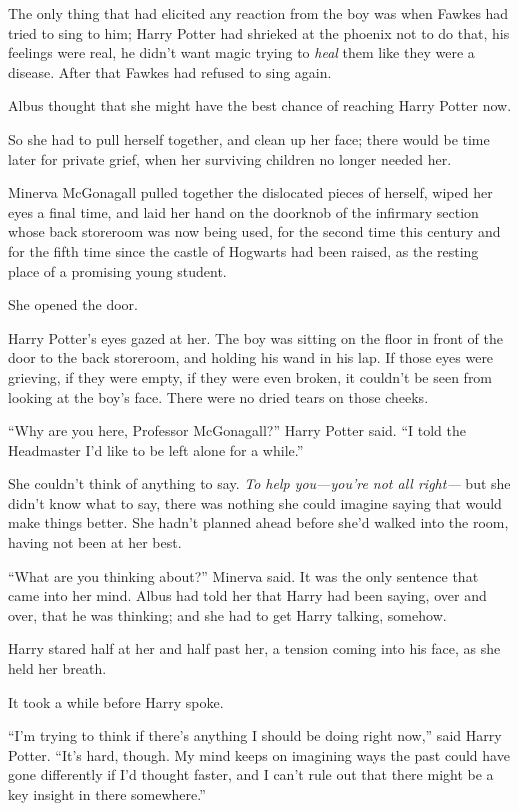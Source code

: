 The only thing that had elicited any reaction from the boy was when Fawkes had tried to sing to him; Harry Potter had shrieked at the phoenix not to do that, his feelings were real, he didn’t want magic trying to \emph{heal} them like they were a disease. After that Fawkes had refused to sing again.

Albus thought that she might have the best chance of reaching Harry Potter now.

So she had to pull herself together, and clean up her face; there would be time later for private grief, when her surviving children no longer needed her.

Minerva McGonagall pulled together the dislocated pieces of herself, wiped her eyes a final time, and laid her hand on the doorknob of the infirmary section whose back storeroom was now being used, for the second time this century and for the fifth time since the castle of Hogwarts had been raised, as the resting place of a promising young student.

She opened the door.

Harry Potter’s eyes gazed at her. The boy was sitting on the floor in front of the door to the back storeroom, and holding his wand in his lap. If those eyes were grieving, if they were empty, if they were even broken, it couldn’t be seen from looking at the boy’s face. There were no dried tears on those cheeks.

“Why are you here, Professor McGonagall?” Harry Potter said. “I told the Headmaster I’d like to be left alone for a while.”

She couldn’t think of anything to say. \emph{To help you—you’re not all right—} but she didn’t know what to say, there was nothing she could imagine saying that would make things better. She hadn’t planned ahead before she’d walked into the room, having not been at her best.

“What are you thinking about?” Minerva said. It was the only sentence that came into her mind. Albus had told her that Harry had been saying, over and over, that he was thinking; and she had to get Harry talking, somehow.

Harry stared half at her and half past her, a tension coming into his face, as she held her breath.

It took a while before Harry spoke.

“I’m trying to think if there’s anything I should be doing right now,” said Harry Potter. “It’s hard, though. My mind keeps on imagining ways the past could have gone differently if I’d thought faster, and I can’t rule out that there might be a key insight in there somewhere.”

